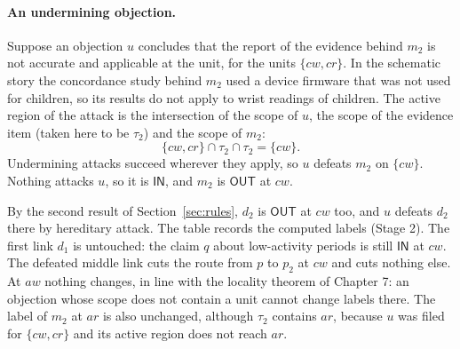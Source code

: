 \documentclass[11pt]{article}
\newcommand{\IN}{\textsf{IN}}
\newcommand{\OUT}{\textsf{OUT}}
\begin{document}
\paragraph{An undermining objection.} Suppose an objection $u$ concludes that the report of the evidence behind $m_2$ is not accurate and applicable at the unit, for the units $\{cw,cr\}$. In the schematic story the concordance study behind $m_2$ used a device firmware that was not used for children, so its results do not apply to wrist readings of children. The active region of the attack is the intersection of the scope of $u$, the scope of the evidence item (taken here to be $\tau_2$) and the scope of $m_2$:
\[
\{cw,cr\}\cap\tau_2\cap\tau_2=\{cw\}.
\]
Undermining attacks succeed wherever they apply, so $u$ defeats $m_2$ on $\{cw\}$. Nothing attacks $u$, so it is $\IN$, and $m_2$ is $\OUT$ at $cw$.

By the second result of Section~\ref{sec:rules}, $d_2$ is $\OUT$ at $cw$ too, and $u$ defeats $d_2$ there by hereditary attack. The table records the computed labels (Stage 2). The first link $d_1$ is untouched: the claim $q$ about low-activity periods is still $\IN$ at $cw$. The defeated middle link cuts the route from $p$ to $p_2$ at $cw$ and cuts nothing else. At $aw$ nothing changes, in line with the locality theorem of Chapter 7: an objection whose scope does not contain a unit cannot change labels there. The label of $m_2$ at $ar$ is also unchanged, although $\tau_2$ contains $ar$, because $u$ was filed for $\{cw,cr\}$ and its active region does not reach $ar$.
\end{document}
